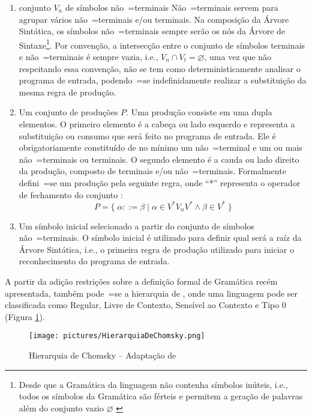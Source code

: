 {\begin{enumerate}
        \item {} conjunto $V_n$ de símbolos
        não~=terminais
        Não~=terminais servem para agrupar vários não~=terminais e/ou terminais.
        Na composição da Árvore Sintática,
        os símbolos não~=terminais sempre serão os nós da Árvore de Sintaxe\footnote{Desde
        que a Gramática da linguagem não contenha símbolos inúteis,
        i.e.,
        todos os símbolos da Gramática são férteis e
        permitem a geração de palavras além do conjunto vazio $\varnothing$ \cite{hopcroftBook}}.
        Por convenção,
        a intersecção entre o conjunto de símbolos terminais e
        não~=terminais é sempre vazia,
        i.e.,
        $V_n \cap V_t = \varnothing$,
        uma vez que não respeitando essa convenção,
        não se tem como deterministicamente analisar o programa de entrada,
        podendo~=se indefinidamente realizar a substituição da mesma regra de produção.

        \item \label{definicaoDeGramatica}Um conjunto de produções $P$.
        Uma produção consiste em uma dupla elementos.
        O primeiro elemento é a cabeça ou lado esquerdo e
        representa a substituição ou consumo que será feito no programa de entrada.
        Ele é obrigatoriamente constituído de no mínimo um não~=terminal e
        um ou mais não~=terminais ou terminais.
        O segundo elemento é a cauda ou lado direito da produção,
        composto de terminais e/ou não~=terminais.
        Formalmente defini~=se um produção pela seguinte regra,
        onde ``*'' representa o operador de fechamento do conjunto \cite{hopcroftBook}:
        $$P = \{\; \alpha ::= \beta \;|\; \alpha \in V^* V_n V^* \land \beta \in V^* \;\}$$

        \item Um símbolo inicial selecionado a partir do conjunto de símbolos não~=terminais.
        O símbolo inicial é utilizado para definir qual será a raíz da Árvore Sintática,
        i.e.,
        o primeira regra de produção utilizado para iniciar o reconhecimento do programa de entrada.
    \end{enumerate}

    A partir da adição restrições sobre a definição formal de Gramática recém apresentada,
    também pode~=se  a hierarquia de
    ,
    onde uma linguagem pode ser classificada como Regular,
    Livre de Contexto,
    Sensível ao Contexto e
    Tipo 0 (Figura \ref{fig:pictures/HierarquiaDeChomsky.png}).
    \begin{figure}[H]
    \centering
    \texttt{[image: pictures/HierarquiaDeChomsky.png]}
    \caption{Hierarquia de Chomsky -- Adaptação de }
    \label{fig:pictures/HierarquiaDeChomsky.png}
    \end{figure}

}
